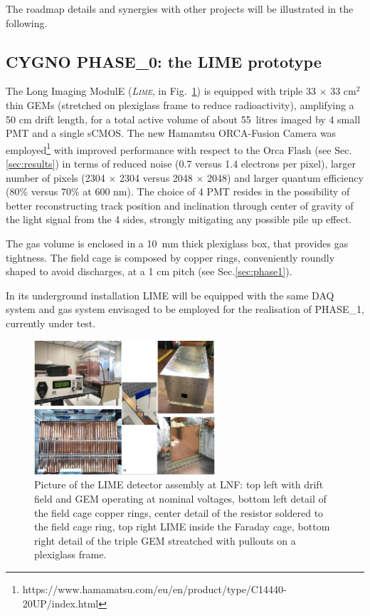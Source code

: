 \documentclass[physics,article,submit,moreauthors,pdftex]{Definitions/mdpi}
\newcommand{\lime}{{\textsc{Lime}}\xspace}
\begin{document}

The roadmap details and synergies with other projects will be illustrated in the following. 

\subsection{CYGNO PHASE\_0: the LIME prototype}\label{sec:phase0}

The Long Imaging ModulE ({\it \lime}, in Fig.~\ref{fig:LIME_pic}) is equipped with triple 33 $\times$ 33 cm$^2$ thin GEMs (stretched on plexiglass frame to reduce radioactivity), amplifying a 50 cm drift length, for a total active volume of about 55~litres imaged by 4 small PMT and a single sCMOS. The new Hamamtsu ORCA-Fusion Camera was employed\footnote{https://www.hamamatsu.com/eu/en/product/type/C14440-20UP/index.html} with improved performance with respect to the Orca Flash (see Sec.\ref{sec:results}) in terms of reduced noise (0.7 versus 1.4 electrons per pixel), larger number of pixels (2304 $\times$ 2304 versus 2048 $\times$ 2048) and larger quantum efficiency (80$\%$ versus 70$\%$ at 600 nm). 
The choice of 4 PMT resides in the possibility of better reconstructing track position and inclination through center of gravity of the light signal from the 4 sides, strongly mitigating any possible pile up effect.

The gas volume is enclosed in a 10~mm thick plexiglass box, that provides gas tightness. The field cage is composed by copper rings, conveniently roundly shaped to avoid discharges, at a 1 cm pitch (see Sec.\ref{sec:phase1}).

In its underground installation LIME will be equipped with the same DAQ system and gas system envisaged to be employed for the realisation of PHASE\_1, currently under test.

\begin{figure}[!t]
\centering
 \includegraphics[width=0.6\textwidth]{LIME_pic.jpeg}
 \caption{Picture of the LIME detector assembly at LNF: top left with drift field and GEM operating at nominal voltages, bottom left detail of the field cage copper rings, center detail of the resistor soldered to the field cage ring, top right LIME inside the Faraday cage, bottom right detail of the triple GEM streatched with pullouts on a plexiglass frame.}
 \label{fig:LIME_pic}
 \end{figure}
\end{document}
